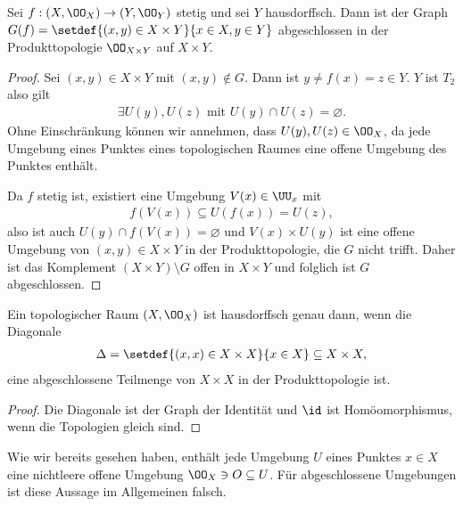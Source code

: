 \begin{prop}
\label{prop:2.1.10}
Sei $f:(X,\OO_X)\to(Y,\OO_Y)$ stetig und sei $Y$ hausdorffsch. Dann ist der
Graph $G(f) = \setdef{(x,y)\in X\times Y}{x\in X,y\in Y}$ abgeschlossen in der
Produkttopologie $\OO_{X\times Y}$ auf $X\times Y$.\fishhere
\end{prop}
\begin{proof}
Sei $(x,y)\in X\times Y$ mit $(x,y)\notin G$. Dann ist $y\neq f(x) = z\in Y$.
$Y$ ist $T_2$ also gilt
\begin{align*}
\exists U(y), U(z) \text{ mit } U(y)\cap U(z) = \varnothing.
\end{align*}
Ohne Einschränkung können wir annehmen, dass $U(y),U(z)\in\OO_X$, da jede
Umgebung eines Punktes eines topologischen Raumes eine offene Umgebung des
Punktes enthält.

Da $f$ stetig ist, existiert eine Umgebung $V(x)\in \UU_x$ mit 
\begin{align*}
f(V(x))\subseteq U(f(x)) = U(z),
\end{align*}
also ist auch $U(y)\cap f(V(x))=\varnothing$ und $V(x)\times U(y)$ ist eine
offene Umgebung von $(x,y)\in X\times Y$ in der Produkttopologie, die $G$ nicht
trifft. Daher ist das Komplement $(X\times Y)\setminus G$ offen in $X\times Y$
und folglich ist $G$ abgeschlossen.\qedhere
\end{proof}

\begin{prop}
\label{prop:2.1.11}
Ein topologischer Raum $(X,\OO_X)$ ist hausdorffsch genau dann, wenn die
Diagonale
\begin{align*}
\Delta = \setdef{(x,x)\in X\times X}{x\in X}\subseteq X\times X,
\end{align*}
eine abgeschlossene Teilmenge von $X\times X$ in der Produkttopologie
ist.\fishhere
\end{prop}
\begin{proof}
Die Diagonale ist der Graph der Identität und $\id$ ist Homöomorphismus, wenn
die Topologien gleich sind.\qedhere
\end{proof}

Wie wir bereits gesehen haben, enthält jede Umgebung $U$ eines
Punktes $x\in X$ eine nichtleere offene Umgebung $\OO_X\ni O\subseteq
U$. Für abgeschlossene Umgebungen ist diese Aussage im Allgemeinen falsch.


